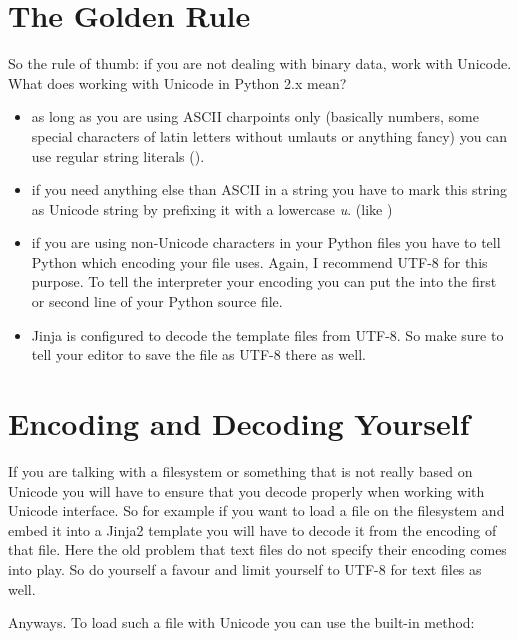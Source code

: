 \documentclass[a4paper,12pt]{sphinxmanual}
\begin{document}
\section{The Golden Rule}
\label{unicode:the-golden-rule}
So the rule of thumb: if you are not dealing with binary data, work with
Unicode.  What does working with Unicode in Python 2.x mean?
\begin{itemize}
\item {} 
as long as you are using ASCII charpoints only (basically numbers,
some special characters of latin letters without umlauts or anything
fancy) you can use regular string literals ().

\item {} 
if you need anything else than ASCII in a string you have to mark
this string as Unicode string by prefixing it with a lowercase \emph{u}.
(like )

\item {} 
if you are using non-Unicode characters in your Python files you have
to tell Python which encoding your file uses.  Again, I recommend
UTF-8 for this purpose.  To tell the interpreter your encoding you can
put the  into the first or second line of
your Python source file.

\item {} 
Jinja is configured to decode the template files from UTF-8.  So make
sure to tell your editor to save the file as UTF-8 there as well.

\end{itemize}


\section{Encoding and Decoding Yourself}
\label{unicode:encoding-and-decoding-yourself}
If you are talking with a filesystem or something that is not really based
on Unicode you will have to ensure that you decode properly when working
with Unicode interface.  So for example if you want to load a file on the
filesystem and embed it into a Jinja2 template you will have to decode it
from the encoding of that file.  Here the old problem that text files do
not specify their encoding comes into play.  So do yourself a favour and
limit yourself to UTF-8 for text files as well.

Anyways.  To load such a file with Unicode you can use the built-in
 method:
\end{document}
